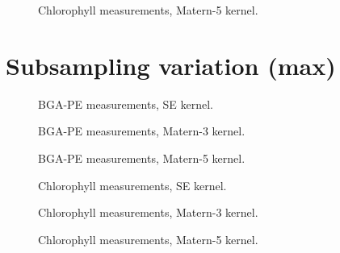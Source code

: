 \documentclass{article}
\newlength\figureheight
\newlength\figurewidth
\begin{document}
\begin{figure}[!h]
\centering

\caption{Chlorophyll measurements, Matern-5 kernel.}
\end{figure}

\FloatBarrier

\section{Subsampling variation (max)}
\setlength\figureheight{1.8in}
\setlength{}
\begin{figure}[!h]
\centering

\caption{BGA-PE measurements, SE kernel.}
\end{figure}

\begin{figure}[!h]
\centering

\caption{BGA-PE measurements, Matern-3 kernel.}
\end{figure}

\begin{figure}[!h]
\centering

\caption{BGA-PE measurements, Matern-5 kernel.}
\end{figure}

\begin{figure}[!h]
\centering

\caption{Chlorophyll measurements, SE kernel.}
\end{figure}

\begin{figure}[!h]
\centering

\caption{Chlorophyll measurements, Matern-3 kernel.}
\end{figure}

\begin{figure}[!h]
\centering

\caption{Chlorophyll measurements, Matern-5 kernel.}
\end{figure}

%
\end{document}

